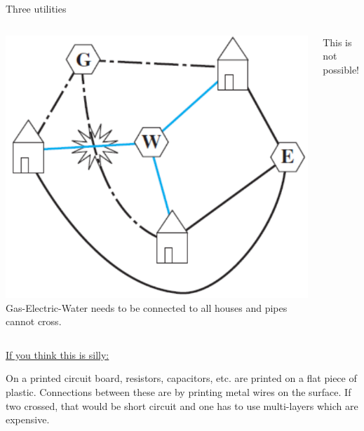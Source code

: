 \documentclass{beamer}
\begin{document}
\begin{frame}{Three utilities}
\begin{columns}
\includegraphics[scale=0.45]{ThreeUtils.pdf}
Gas-Electric-Water needs to be connected to all houses and pipes cannot cross.\vspace{0.5cm}

\center \color{red} This is not possible!
\end{columns}\vspace{0.3cm}
\underline{If you think this is silly:}
\vspace{0.5cm}

On a printed circuit board, resistors, capacitors, etc. are printed on a flat piece of plastic. Connections between these are by printing metal wires on the surface. If two crossed, that would be short circuit and one has to use multi-layers which are expensive.
\end{frame}
\end{document}
